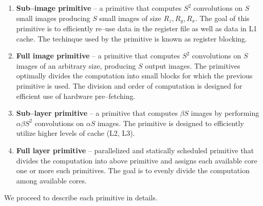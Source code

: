   \begin{enumerate}
  \item {\bf Sub--image primitive} -- a primitive that computes $S^2$
    convolutions on $S$ small images producing $S$ small images of
    size $R_z, R_y, R_x$.  The goal of this primitive is to
    efficiently re--use data in the register file as well as data in
    L1 cache.  The techinque used by the primitive is known as
    register blocking.
  \item {\bf Full image primitive} -- a primitive that computes $S^2$
    convolutions on $S$ images of an arbitrary size, producing $S$
    output images.  The primitives optimally divides the computation
    into small blocks for which the previous primitive is used.  The
    division and order of computation is designed for efficient use of
    hardware pre--fetching.
  \item {\bf Sub--layer primitive} -- a primitive that computes
    $\beta S$ images by performing $\alpha \beta S^2$
    convolutions on $\alpha S$ images.  The primitive is designed to
    efficiently utilize higher levels of cache (L2, L3).
  \item {\bf Full layer primitive} -- parallelized and statically
    scheduled primitive that divides the computation into above
    primitive and assigns each available core one or more such
    primitives.  The goal is to evenly divide the computation among
    available cores.
  \end{enumerate}

  We proceed to describe each primitive in details.

